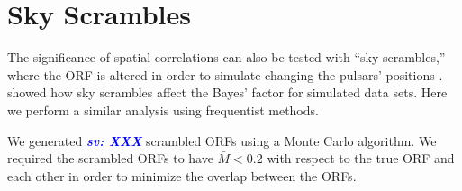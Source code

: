 \documentclass[twocolumn,aps,prd,superscriptaddress]{revtex4-1}
\newcommand{\sv}[1]{\textcolor{blue}{\it{\textbf{sv: #1}}} }
\newcommand{\Agw}{\ensuremath{A_\mathrm{gw}}}
\begin{document}
\section{Sky Scrambles}
\label{sec:skyscrambles}

The significance of spatial correlations can also be tested with ``sky scrambles,'' 
where the ORF is altered in order to simulate changing the pulsars' positions \citep{cs2016}. 
\citet{tlb+2017} showed how sky scrambles affect the Bayes' factor for simulated data sets. 
Here we perform a similar analysis using frequentist methods.

We generated \sv{XXX} scrambled ORFs 
using a Monte Carlo algorithm. 
We required the scrambled ORFs to have $\bar{M} < 0.2$ 
with respect to the true ORF and each other 
in order to minimize the overlap between the ORFs. 
\end{document}
